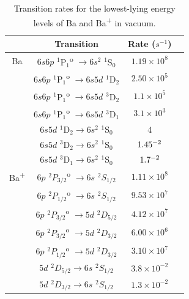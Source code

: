 \begin{table}[!htbp]
\caption{Transition rates for the lowest-lying energy levels of Ba and Ba\textsuperscript{+} in vacuum.} %
\label{table:BaTransitions}
\begin{tabular}{c|c|c c}
& Transition & Rate ($s^{-1}$) &  \\
\hline
Ba & $6s6p$ $^{1}$P$_{1}$\textsuperscript{o} $\rightarrow 6s^{2}$ $^{1}$S$_{0}$ & $1.19 \times 10^{8}$ & \cite{BaAllowedTransitions} \\
& $6s6p$ $^{1}$P$_{1}$\textsuperscript{o} $\rightarrow 6s5d$ $^{1}$D$_{2}$ & $2.50 \times 10^{5}$ & \cite{BaAllowedTransitions} \\
& $6s6p$ $^{1}$P$_{1}$\textsuperscript{o} $\rightarrow 6s5d$ $^{3}$D$_{2}$ & $1.1 \times 10^{5}$ & \cite{BaAllowedTransitions} \\
& $6s6p$ $^{1}$P$_{1}$\textsuperscript{o} $\rightarrow 6s5d$ $^{3}$D$_{1}$ & $3.1 \times 10^{3}$ & \cite{BaAllowedTransitions} \\
& $6s5d$ $^{1}$D$_{2} \rightarrow 6s^{2}$ $^{1}$S$_{0}$ & $4$ & \cite{Ba1D2and3D1} \\
& $6s5d$ $^{3}$D$_{2} \rightarrow 6s^{2}$ $^{1}$S$_{0}$ & $1.45 \time 10^{-2}$ & \cite{Ba3D2} \\
& $6s5d$ $^{3}$D$_{1} \rightarrow 6s^{2}$ $^{1}$S$_{0}$ & $1.7 \time 10^{-2}$ & \cite{Ba1D2and3D1} \\
\hline
Ba\textsuperscript{+} & $6p$ $^{2}P_{3/2}$\textsuperscript{o} $\rightarrow 6s $ $^{2}S_{1/2}$ & $1.11 \times 10^{8}$ & \cite{BaAllowedTransitions} \\
& $6p$ $^{2}P_{1/2}$\textsuperscript{o} $\rightarrow 6s$ $^{2}S_{1/2}$ & $9.53 \times 10^{7}$ & \cite{BaAllowedTransitions} \\
& $6p$ $^{2}P_{3/2}$\textsuperscript{o} $\rightarrow 5d$ $^{2}D_{5/2}$ & $4.12 \times 10^{7}$ & \cite{BaAllowedTransitions} \\
& $6p$ $^{2}P_{3/2}$\textsuperscript{o} $\rightarrow 5d$ $^{2}D_{3/2}$ & $6.00 \times 10^{6}$ & \cite{BaAllowedTransitions} \\
& $6p$ $^{2}P_{1/2}$\textsuperscript{o} $\rightarrow 5d$ $^{2}D_{3/2}$ & $3.10 \times 10^{7}$ & \cite{BaAllowedTransitions} \\
& $5d$ $^{2}D_{5/2} \rightarrow 6s$ $^{2}S_{1/2}$ & $3.8 \times 10^{-2}$ & \cite{BaPlusD52} \\
& $5d$ $^{2}D_{3/2} \rightarrow 6s$ $^{2}S_{1/2}$ & $1.3 \times 10^{-2}$ & \cite{BaPlusD32} \\
\end{tabular}
\end{table}

